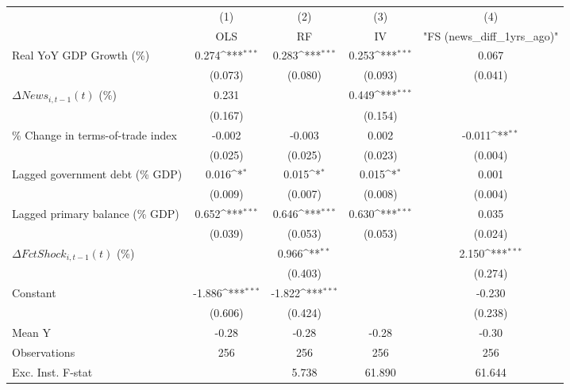 {
\def\sym#1{\ifmmode^{#1}\else\(^{#1}\)\fi}
\begin{tabular}{l*{4}{c}}
\toprule
                    &\multicolumn{1}{c}{(1)}&\multicolumn{1}{c}{(2)}&\multicolumn{1}{c}{(3)}&\multicolumn{1}{c}{(4)}\\
                    &\multicolumn{1}{c}{OLS}&\multicolumn{1}{c}{RF}&\multicolumn{1}{c}{IV}&\multicolumn{1}{c}{ "FS (news_diff_1yrs_ago)" }\\
\midrule
Real YoY GDP Growth (\%)&       0.274\sym{***}&       0.283\sym{***}&       0.253\sym{***}&       0.067         \\
                    &     (0.073)         &     (0.080)         &     (0.093)         &     (0.041)         \\
\addlinespace
$ \Delta News_{i,t-1}(t)$ (\%)&       0.231         &                     &       0.449\sym{***}&                     \\
                    &     (0.167)         &                     &     (0.154)         &                     \\
\addlinespace
\% Change in terms-of-trade index&      -0.002         &      -0.003         &       0.002         &      -0.011\sym{**} \\
                    &     (0.025)         &     (0.025)         &     (0.023)         &     (0.004)         \\
\addlinespace
Lagged government debt (\% GDP)&       0.016\sym{*}  &       0.015\sym{*}  &       0.015\sym{*}  &       0.001         \\
                    &     (0.009)         &     (0.007)         &     (0.008)         &     (0.004)         \\
\addlinespace
Lagged primary balance (\% GDP)&       0.652\sym{***}&       0.646\sym{***}&       0.630\sym{***}&       0.035         \\
                    &     (0.039)         &     (0.053)         &     (0.053)         &     (0.024)         \\
\addlinespace
$ \Delta FctShock_{i,t-1}(t)$ (\%)&                     &       0.966\sym{**} &                     &       2.150\sym{***}\\
                    &                     &     (0.403)         &                     &     (0.274)         \\
\addlinespace
Constant            &      -1.886\sym{***}&      -1.822\sym{***}&                     &      -0.230         \\
                    &     (0.606)         &     (0.424)         &                     &     (0.238)         \\
\midrule
Mean Y              &       -0.28         &       -0.28         &       -0.28         &       -0.30         \\
Observations        &         256         &         256         &         256         &         256         \\
Exc. Inst. F-stat   &                     &       5.738         &      61.890         &      61.644         \\
\bottomrule
\end{tabular}
}
